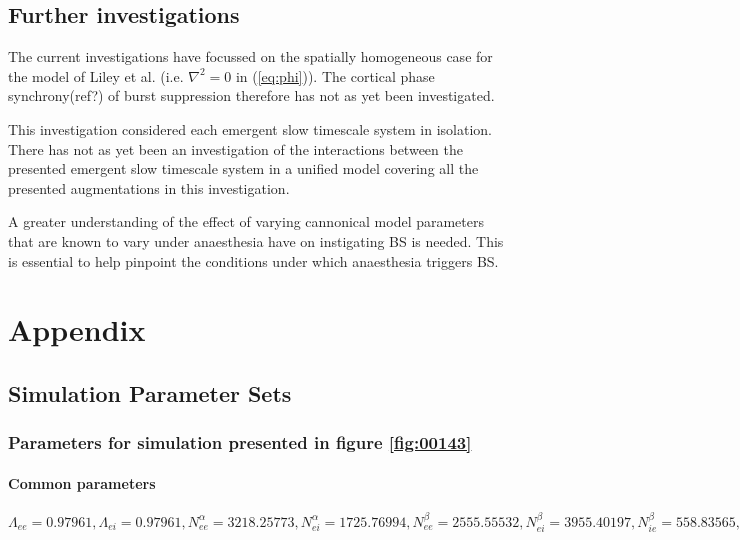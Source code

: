 \documentclass[a4paper,12pt]{article}
\begin{document}
\subsection{Further investigations}
The current investigations have focussed on the spatially homogeneous case for the model of Liley et al. (i.e. $\nabla^2 =
0$ in (\ref{eq:phi})). The cortical phase synchrony(ref?) of burst suppression therefore has not as yet been investigated.

This investigation considered each emergent slow timescale system in isolation. There has not as yet been an investigation of the
interactions between the presented emergent slow timescale system in a unified model covering all the presented augmentations in this investigation.

A greater understanding of the effect of varying cannonical model parameters that are known to vary under anaesthesia have on instigating BS is needed. This is essential to help pinpoint the conditions under which anaesthesia triggers BS.

\appendix
\section{Appendix}
\subsection{Simulation Parameter Sets}
\subsubsection{Parameters for simulation presented in figure \ref{fig:00143}}
\paragraph{Common parameters}
$\Lambda_{ee} = 0.97961, \Lambda_{ei} = 0.97961, N^{\alpha}_{ee} = 3218.25773, N^{\alpha}_{ei} = 1725.76994,
N^{\beta}_{ee} = 2555.55532, N^{\beta}_{ei} = 3955.40197, N^{\beta}_{ie} = 558.83565, N^{\beta}_{ii} = 805.76418,
\Gamma_{ee} = 0.15173, \Gamma_{ei} = 0.27124, 
 g = 0.7, \gamma_{ee} = 0.31475, \gamma_{ei} = 0.24595,  h_e^{rest} = -66.96585, h_{ee}^{eq} = 0.03533, h_{ei}^{eq} = -6.84352,
h_i^{rest} = -77.90611, h_{ie}^{eq} = -85.52639, h_{ii}^{eq} = -85.43499,
\mu_e = -50.73253, \mu_i = -51.66220,  \hat{p}_{ee} = 2.16873, \hat{p}_{ei} = 2.43422, p_{ie} = 0.0, p_{ii} = 0.0, \phi_{ie} = 0,
\phi_{ii} = 0, S_e^{max} = 0.101903, S_i^{max} = 0.469, \sigma_e = 6.02439, \sigma_i = 4.21866,
\rho_e = 800.0, \rho_i = 3200.0, \tau_e = 139.779, \tau_i = 22.5263, \tau^{slow} = 6988.95,
v_{ee} = 0.68140, v_{ei} = 0.68140$
\end{document}
